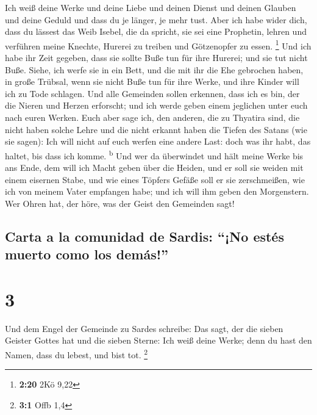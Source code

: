  Ich weiß deine Werke und deine Liebe und deinen Dienst
und deinen Glauben und deine Geduld und dass du je länger, je mehr tust.
 Aber ich habe wider dich, dass du lässest das Weib
Isebel, die da spricht, sie sei eine Prophetin, lehren und verführen
meine Knechte, Hurerei zu treiben und Götzenopfer zu essen. \footnote{\textbf{2:20}
  2Kö 9,22}  Und ich habe ihr Zeit gegeben, dass sie
sollte Buße tun für ihre Hurerei; und sie tut nicht Buße.
 Siehe, ich werfe sie in ein Bett, und die mit ihr die
Ehe gebrochen haben, in große Trübsal, wenn sie nicht Buße tun für ihre
Werke,  und ihre Kinder will ich zu Tode schlagen. Und
alle Gemeinden sollen erkennen, dass ich es bin, der die Nieren und
Herzen erforscht; und ich werde geben einem jeglichen unter euch nach
euren Werken.  Euch aber sage ich, den anderen, die zu
Thyatira sind, die nicht haben solche Lehre und die nicht erkannt haben
die Tiefen des Satans (wie sie sagen): Ich will nicht auf euch werfen
eine andere Last:  doch was ihr habt, das haltet, bis
dass ich komme. \textsuperscript{b}  Und wer da
überwindet und hält meine Werke bis ans Ende, dem will ich Macht geben
über die Heiden,  und er soll sie weiden mit einem
eisernen Stabe, und wie eines Töpfers Gefäße soll er sie zerschmeißen,
 wie ich von meinem Vater empfangen habe; und ich will
ihm geben den Morgenstern.  Wer Ohren hat, der höre, was
der Geist den Gemeinden sagt!

\hypertarget{carta-a-la-comunidad-de-sardis-no-estuxe9s-muerto-como-los-demuxe1s}{%
\subsection{Carta a la comunidad de Sardis: ``¡No estés muerto como los
demás!''}\label{carta-a-la-comunidad-de-sardis-no-estuxe9s-muerto-como-los-demuxe1s}}

\hypertarget{section-2}{%
\section{3}\label{section-2}}

 Und dem Engel der Gemeinde zu Sardes schreibe: Das sagt,
der die sieben Geister Gottes hat und die sieben Sterne: Ich weiß deine
Werke; denn du hast den Namen, dass du lebest, und bist tot. \footnote{\textbf{3:1}
  Offb 1,4}

